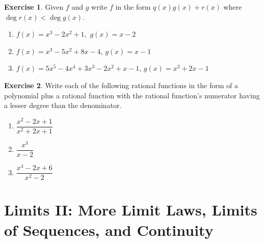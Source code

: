 \documentclass[english]{book}
\theoremstyle{remark}
\theoremstyle{definition}
\newtheorem{excs}{Exercise}
\newtheorem*{next week}{Next Week}
\begin{document}
\begin{excs}
	Given $f$ and $g$ write $f$ in the form $q(x)g(x)+r(x)$ where $\deg r(x)<\deg g(x)$.
	\begin{enumerate}[label=\alph*)]
		\item $f(x)=x^3-2x^2+1,$ $g(x)=x-2$
		\item $f(x)=x^3-5x^2+8x-4$, $g(x)=x-1$
		\item $f(x)=5x^5-4x^4+3x^3-2x^2+x-1$,  $g(x)=x^3+2x-1$
		
	\end{enumerate}
\end{excs}
\begin{excs}
	Write each of the following rational functions in the form of a polynomial plus a rational function with the rational function's numerator having a lesser degree than the denominator.
	\begin{enumerate}[label=\alph*)]
		\item $\dfrac{x^2-2x+1}{x^2+2x+1}$
		\item $\dfrac{x^3}{x-2}$
		\item $\dfrac{x^4-2x+6}{x^2-2}$
	\end{enumerate}
\end{excs}
\section{Limits II: More Limit Laws, Limits of Sequences, and Continuity}
\end{document}
